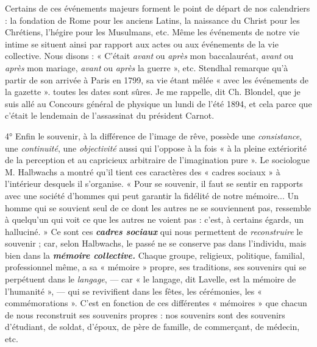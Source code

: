 \vspace{0.24cm}
{\footnotesize 
Certains de ces événements majeurs forment le point de départ de nos
calendriers : la fondation de Rome pour les anciens Latins, la naissance du
Christ pour les Chrétiens, l’hégire pour les Musulmans, etc. Même les événements
de notre vie intime se situent ainsi par rapport aux actes ou aux
événements de la vie collective. Nous disons : « C'était {\it avant} ou {\it après} mon
baccalauréat, {\it avant} ou {\it après} mon mariage, {\it avant} ou {\it après} la guerre », etc.
Stendhal remarque qu’à partir de son arrivée à Paris en 1799, sa vie étant
mêlée « avec les événements de la gazette ». toutes les dates sont sûres.
Je me rappelle, dit Ch. Blondel, que je suis allé au Concours général de
physique un lundi de l'été 1894, et cela parce que c'était le lendemain de
l’assassinat du président Carnot.}
\vspace{0.31cm}

4° Enfin le souvenir, à la différence de l’image de rêve, possède une
{\it consistance}, une {\it continuité}, une {\it objectivité} aussi qui l’oppose à la fois
« à la pleine extériorité de la perception et au capricieux arbitraire
de l’imagination pure ». Le sociologue M. Halbwachs a montré qu'il
tient ces caractères des « cadres sociaux » à l’intérieur desquels il s’organise.
« Pour se souvenir, il faut se sentir en rapports avec une société
d'hommes qui peut garantir la fidélité de notre mémoire... Un homme
qui se souvient seul de ce dont les autres ne se souviennent pas, ressemble
à quelqu’un qui voit ce que les autres ne voient pas : c’est, à
certains égards, un halluciné. » Ce sont ces \textbf{\textit {cadres sociaux}} qui nous
permettent de {\it reconstruire} le souvenir ; car, selon Halbwachs, le
passé ne se conserve pas dans l'individu, mais bien dans la \textbf{\textit {mémoire
collective.}} Chaque groupe, religieux, politique, familial, professionnel
même, a sa « mémoire » propre, ses traditions, ses souvenirs qui se
perpétuent dans le {\it langage}, — car « le langage, dit Lavelle, est la
mémoire de l’humanité », — qui se revivifient dans les fêtes, les cérémonies,
les « commémorations ». C’est en fonction de ces différentes
« mémoires » que chacun de nous reconstruit ses souvenirs propres :
nos souvenirs sont des souvenirs d'étudiant, de soldat, d’époux, de
père de famille, de commerçant, de médecin, etc.


